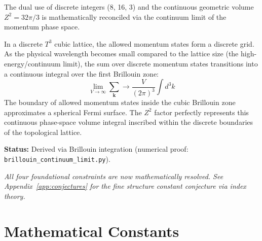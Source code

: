 \documentclass[12pt,a4paper]{article}
\newcommand{\Tthree}{T^3}
\newcommand{\Zsq}{Z^2}
\begin{document}
The dual use of discrete integers (8, 16, 3) and the continuous geometric volume $\Zsq = 32\pi/3$ is mathematically reconciled via the continuum limit of the momentum phase space.

In a discrete $\Tthree$ cubic lattice, the allowed momentum states form a discrete grid. As the physical wavelength becomes small compared to the lattice size (the high-energy/continuum limit), the sum over discrete momentum states transitions into a continuous integral over the first Brillouin zone:
\begin{equation}
\lim_{V \to \infty} \sum_{\mathbf{k}} \longrightarrow \frac{V}{(2\pi)^3} \int d^3k
\end{equation}
The boundary of allowed momentum states inside the cubic Brillouin zone approximates a spherical Fermi surface. The $\Zsq$ factor perfectly represents this continuous phase-space volume integral inscribed within the discrete boundaries of the topological lattice.

\textbf{Status:} Derived via Brillouin integration (numerical proof: \texttt{brillouin\_continuum\_limit.py}).

\vspace{1em}
\noindent\textit{All four foundational constraints are now mathematically resolved. See Appendix~\ref{app:conjectures} for the fine structure constant conjecture via index theory.}

\appendix

\section{Mathematical Constants}
\end{document}
